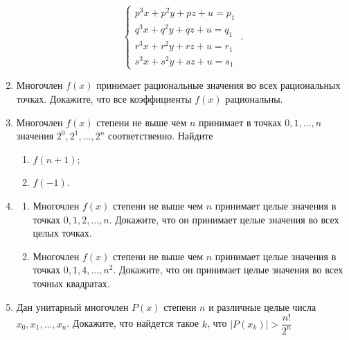 \documentclass{article}
\begin{document}
\begin{enumerate}[label*=\protect\fbox{\arabic{enumi}}]
$$
\begin{cases}
	p^3x+p^2y+pz+u = p_1\\
	q^3x+q^2y+qz+u = q_1\\
	r^3x+r^2y+rz+u = r_1\\
 	s^3x+s^2y+sz+u = s_1
\end{cases}\,.
$$

\item Многочлен $f(x)$ принимает рациональные значения во всех рациональных точках. Докажите, что все коэффициенты $f(x)$ рациональны.

\item Многочлен $f(x)$ степени не выше чем $n$ принимает в точках $0, 1, \dotsc, n$ значения $2^0, 2^1, \dotsc, 2^n$ соответственно. Найдите 

\begin{enumerate}
	\item $f(n+1);$
	\item $f(-1).$
\end{enumerate} 
\item  
\begin{enumerate}
	\item Многочлен $f(x)$ степени не выше чем $n$ принимает целые значения в точках $0, 1, 2, \dotsc, n$. Докажите, что он принимает целые значения во всех целых точках.
	\item Многочлен $f(x)$ степени не выше чем $n$ принимает целые значения в точках $0, 1, 4, \dotsc , n^2$. Докажите, что он принимает целые значения во всех точных квадратах.
 \end{enumerate}
\item Дан унитарный многочлен $P(x)$ степени $n$ и различные целые числа $x_0, x_1, \dotsc, x_n$. 
Докажите, что найдется такое $k$, что $|P(x_k)| > \dfrac{n!}{2^n}$

\end{enumerate}

\begin{figure}[h]
\end{figure}
\end{document}
